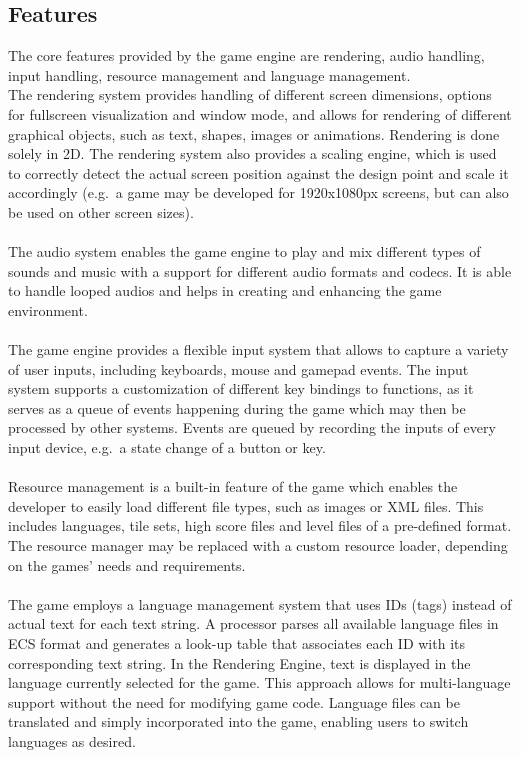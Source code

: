 \subsection{Features}\label{subsec:features}
The core features provided by the game engine are rendering, audio handling, input handling, resource management and language management.
\\
The rendering system provides handling of different screen dimensions, options for fullscreen visualization and window mode, and allows
for rendering of different graphical objects, such as text, shapes, images or animations.
Rendering is done solely in 2D.
The rendering system also provides a scaling engine, which is used to correctly detect the actual screen position against the design point and scale it accordingly
(e.g.\ a game may be developed for 1920x1080px screens, but can also be used on other screen sizes).
\\
\\
The audio system enables the game engine to play and mix different types of sounds and music with a support for different audio formats and codecs.
It is able to handle looped audios and helps in creating and enhancing the game environment.
\\
\\
The game engine provides a flexible input system that allows to capture a variety of user inputs, including keyboards, mouse and gamepad events.
The input system supports a customization of different key bindings to functions, as it serves as a queue of events happening during the game which
may then be processed by other systems.
Events are queued by recording the inputs of every input device, e.g.\ a state change of a button or key.
\\
\\
Resource management is a built-in feature of the game which enables the developer to easily load different file types, such as images or \gls{XML} files.
This includes languages, tile sets, high score files and level files of a pre-defined format.
The resource manager may be replaced with a custom resource loader, depending on the games' needs and requirements.
\\
\\
The game employs a language management system that uses IDs (tags) instead of actual text for each text string.
A processor parses all available language files in \gls{ECS} format and generates a look-up table that associates each ID with its corresponding text string.
In the Rendering Engine, text is displayed in the language currently selected for the game.
This approach allows for multi-language support without the need for modifying game code.
Language files can be translated and simply incorporated into the game, enabling users to switch languages as desired.
